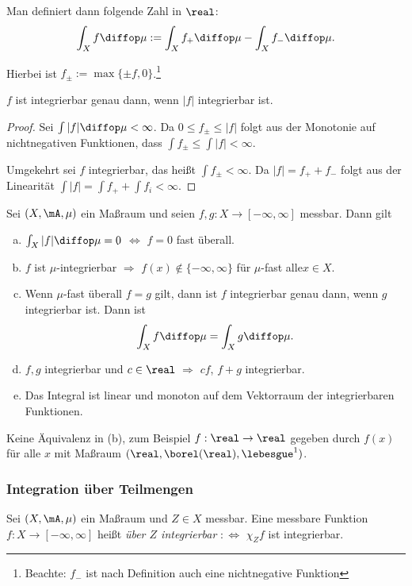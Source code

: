 Man definiert dann folgende Zahl in $\real$:
\[ \int_X f \diffop \mu := \int_X f_+ \diffop \mu - \int_X f_- \diffop \mu. \]

Hierbei ist $f_\pm := \max \{ \pm f, 0 \}$.\footnote{Beachte: $f_-$ ist nach Definition auch eine nichtnegative Funktion}

\begin{rmrk}
 $f$ ist integrierbar genau dann, wenn $|f|$ integrierbar ist.
 \begin{proof}
  Sei $\int |f| \diffop \mu < \infty$. Da $0 \le f_\pm \le |f|$ folgt aus der Monotonie auf nichtnegativen Funktionen, dass $\int f_\pm \le \int |f| < \infty$.
  
  Umgekehrt sei $f$ integrierbar, das heißt $\int f_\pm < \infty$. Da $|f| = f_+ + f_-$ folgt aus der Linearität $\int |f| = \int f_+ + \int f_i < \infty$.
 \end{proof}
\end{rmrk}

\begin{thm}
 Sei $(X,\mA,\mu)$ ein Maßraum und seien $f,g:X \to [-\infty, \infty]$ messbar. Dann gilt
 \begin{enumerate}[(a)]
  \item $\int_X |f| \diffop \mu = 0$ $\Leftrightarrow$ $f=0$ fast überall.
  \item $f$ ist $\mu$-integrierbar $\Rightarrow$ $f(x) \notin \{ -\infty, \infty \}$ für $\mu$-fast alle\footnotemark $x \in X$.
  \item Wenn $\mu$-fast überall $f=g$ gilt, dann ist $f$ integrierbar genau dann, wenn $g$ integrierbar ist. Dann ist
  \[ \int_X f \diffop \mu = \int_X g \diffop \mu. \]
  \item $f,g$ integrierbar und $c \in \real$ $\Rightarrow$ $cf$, $f+g$ integrierbar.
  \item Das Integral ist linear und monoton auf dem Vektorraum der integrierbaren Funktionen.
 \end{enumerate}
\end{thm}

\begin{rmrk}
 Keine Äquivalenz in (b), zum Beispiel $f: \real \to \real$ gegeben durch $f(x)$ für alle $x$ mit Maßraum $(\real, \borel(\real), \lebesgue^1 )$.
\end{rmrk}

\subsubsection{Integration über Teilmengen}
 Sei $(X,\mA,\mu)$ ein Maßraum und $Z \in X$ messbar. Eine messbare Funktion $f:X \to [-\infty,\infty]$ heißt \emph{über $Z$ integrierbar} $:\Leftrightarrow$ $\chi_Z f$ ist integrierbar. 
 
